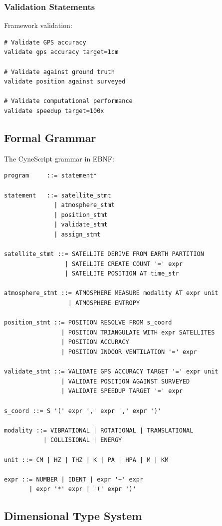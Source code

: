\documentclass[twocolumn,10pt,a4paper]{article}
\theoremstyle{definition}
\theoremstyle{remark}
\begin{document}
\subsubsection{Validation Statements}

Framework validation:
\begin{lstlisting}
# Validate GPS accuracy
validate gps accuracy target=1cm

# Validate against ground truth
validate position against surveyed

# Validate computational performance
validate speedup target=100x
\end{lstlisting}

\subsection{Formal Grammar}

The CyneScript grammar in EBNF:
\begin{verbatim}
program     ::= statement*

statement   ::= satellite_stmt
              | atmosphere_stmt
              | position_stmt
              | validate_stmt
              | assign_stmt

satellite_stmt ::= SATELLITE DERIVE FROM EARTH PARTITION
                 | SATELLITE CREATE COUNT '=' expr
                 | SATELLITE POSITION AT time_str

atmosphere_stmt ::= ATMOSPHERE MEASURE modality AT expr unit
                  | ATMOSPHERE ENTROPY

position_stmt ::= POSITION RESOLVE FROM s_coord
                | POSITION TRIANGULATE WITH expr SATELLITES
                | POSITION ACCURACY
                | POSITION INDOOR VENTILATION '=' expr

validate_stmt ::= VALIDATE GPS ACCURACY TARGET '=' expr unit
                | VALIDATE POSITION AGAINST SURVEYED
                | VALIDATE SPEEDUP TARGET '=' expr

s_coord ::= S '(' expr ',' expr ',' expr ')'

modality ::= VIBRATIONAL | ROTATIONAL | TRANSLATIONAL
           | COLLISIONAL | ENERGY

unit ::= CM | HZ | THZ | K | PA | HPA | M | KM

expr ::= NUMBER | IDENT | expr '+' expr
       | expr '*' expr | '(' expr ')'
\end{verbatim}

\subsection{Dimensional Type System}
\end{document}
